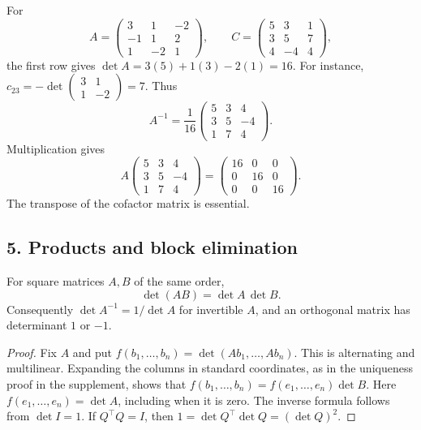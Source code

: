 \begin{example}
For
\[
 A=\begin{pmatrix}3&1&-2\\-1&1&2\\1&-2&1\end{pmatrix},
\qquad
 C=\begin{pmatrix}5&3&1\\3&5&7\\4&-4&4\end{pmatrix},
\]
the first row gives \(\det A=3(5)+1(3)-2(1)=16\).
For instance, \(c_{23}=-\det\begin{pmatrix}3&1\\1&-2\end{pmatrix}=7\).
Thus
\[
 A^{-1}=\frac1{16}\begin{pmatrix}5&3&4\\3&5&-4\\1&7&4\end{pmatrix}.
\]
Multiplication gives
\[
 A\begin{pmatrix}5&3&4\\3&5&-4\\1&7&4\end{pmatrix}
 =\begin{pmatrix}16&0&0\\0&16&0\\0&0&16\end{pmatrix}.
\]
The transpose of the cofactor matrix is essential.
\end{example}

\subsection*{5. Products and block elimination}
\begin{theorem}[Multiplicativity]\label{thm:07:product}
For square matrices \(A,B\) of the same order,
\[
 \det(AB)=\det A\,\det B.
\]
Consequently \(\det A^{-1}=1/\det A\) for invertible \(A\), and an
orthogonal matrix has determinant \(1\) or \(-1\).
\end{theorem}
\begin{proof}
Fix \(A\) and put \(f(b_1,\ldots,b_n)=\det(Ab_1,\ldots,Ab_n)\).
This is alternating and multilinear. Expanding the columns in standard
coordinates, as in the uniqueness proof in the supplement, shows that
\(f(b_1,\ldots,b_n)=f(e_1,\ldots,e_n)\det B\).
Here \(f(e_1,\ldots,e_n)=\det A\), including when it is zero.
The inverse formula follows from \(\det I=1\). If \(Q^\top Q=I\),
then \(1=\det Q^\top\det Q=(\det Q)^2\).
\end{proof}

